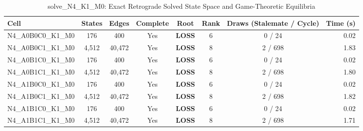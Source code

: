 \begin{table}[htbp]
\centering
\caption{solve\_N4\_K1\_M0: Exact Retrograde Solved State Space and Game-Theoretic Equilibria}
\label{tab:exact_solves}
\begin{tabular}{lccccccr}
\toprule
Cell & States & Edges & Complete & Root & Rank & Draws (Stalemate / Cycle) & Time (s) \\
\midrule
N4\_A0B0C0\_K1\_M0 & 176 & 400 & Yes & \textbf{LOSS} & 6 & 0 / 24 & 0.02 \\
N4\_A0B0C1\_K1\_M0 & 4,512 & 40,472 & Yes & \textbf{LOSS} & 8 & 2 / 698 & 1.83 \\
N4\_A0B1C0\_K1\_M0 & 176 & 400 & Yes & \textbf{LOSS} & 6 & 0 / 24 & 0.02 \\
N4\_A0B1C1\_K1\_M0 & 4,512 & 40,472 & Yes & \textbf{LOSS} & 8 & 2 / 698 & 1.80 \\
N4\_A1B0C0\_K1\_M0 & 176 & 400 & Yes & \textbf{LOSS} & 6 & 0 / 24 & 0.02 \\
N4\_A1B0C1\_K1\_M0 & 4,512 & 40,472 & Yes & \textbf{LOSS} & 8 & 2 / 698 & 1.82 \\
N4\_A1B1C0\_K1\_M0 & 176 & 400 & Yes & \textbf{LOSS} & 6 & 0 / 24 & 0.02 \\
N4\_A1B1C1\_K1\_M0 & 4,512 & 40,472 & Yes & \textbf{LOSS} & 8 & 2 / 698 & 1.71 \\
\bottomrule
\end{tabular}
\end{table}
